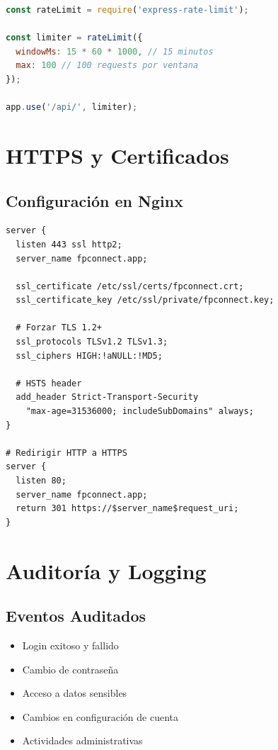 \documentclass[a4paper]{report}
\begin{document}
\begin{lstlisting}[language=JavaScript]
const rateLimit = require('express-rate-limit');

const limiter = rateLimit({
  windowMs: 15 * 60 * 1000, // 15 minutos
  max: 100 // 100 requests por ventana
});

app.use('/api/', limiter);
\end{lstlisting}

\section{HTTPS y Certificados}

\subsection{Configuración en Nginx}

\begin{lstlisting}[language=text,
  caption={Snippet de nginx.conf con SSL}]
server {
  listen 443 ssl http2;
  server_name fpconnect.app;
  
  ssl_certificate /etc/ssl/certs/fpconnect.crt;
  ssl_certificate_key /etc/ssl/private/fpconnect.key;
  
  # Forzar TLS 1.2+
  ssl_protocols TLSv1.2 TLSv1.3;
  ssl_ciphers HIGH:!aNULL:!MD5;
  
  # HSTS header
  add_header Strict-Transport-Security 
    "max-age=31536000; includeSubDomains" always;
}

# Redirigir HTTP a HTTPS
server {
  listen 80;
  server_name fpconnect.app;
  return 301 https://$server_name$request_uri;
}
\end{lstlisting}

\section{Auditoría y Logging}

\subsection{Eventos Auditados}

\begin{itemize}
  \item Login exitoso y fallido
  \item Cambio de contraseña
  \item Acceso a datos sensibles
  \item Cambios en configuración de cuenta
  \item Actividades administrativas
\end{itemize}
\end{document}
